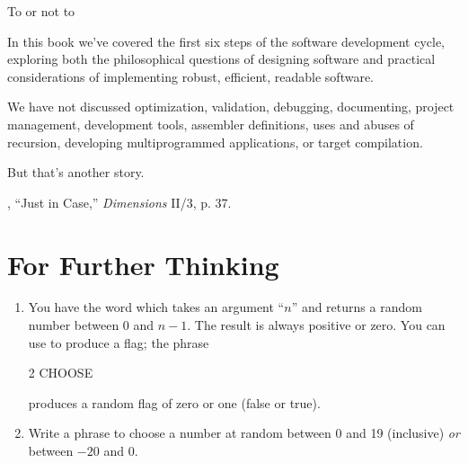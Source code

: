 \begin{tfquot}
To  or not to 
\end{tfquot}
In this book we've covered the first six steps of the software development
cycle, exploring both the philosophical questions of designing software
and practical considerations of implementing robust, efficient, readable
software.

We have not discussed optimization, validation, debugging, documenting,
project management, \Forth{} development tools, assembler
definitions, uses and abuses of recursion, developing multiprogrammed
applications, or target compilation.

But that's another story.

\begin{references}{9}
 , ``Just in Case,'' \emph{\Forth{}
Dimensions} II/3, p. 37.
\end{references}

\section{For Further Thinking}

\begin{enumerate}
\item You have the word  which takes an argument ``$n$'' and returns a
random number between 0 and $n-1$. The result is always positive or zero.
You can use  to produce a flag; the phrase
\begin{Code}
2 CHOOSE
\end{Code}
produces a random flag of zero or one (false or true).

\item Write a phrase to choose a number at random between 0 and 19 (inclusive)
\emph{or} between $-20$ and 0.
\end{enumerate}
